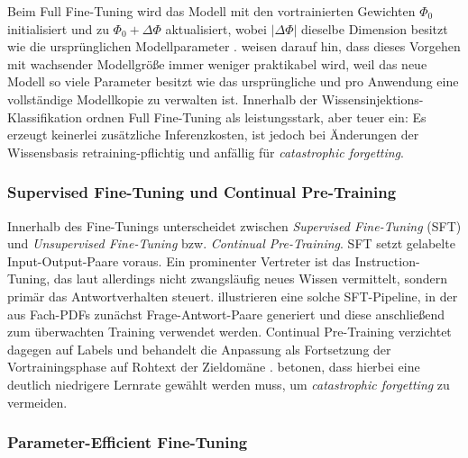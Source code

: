 Beim Full Fine-Tuning wird das Modell mit den vortrainierten Gewichten $\Phi_0$ initialisiert und zu $\Phi_0 + \Delta\Phi$ aktualisiert, wobei $|\Delta\Phi|$ dieselbe Dimension besitzt wie die ursprünglichen Modellparameter \autocite[3]{Hu.2022}. \textcite[1]{Hu.2022} weisen darauf hin, dass dieses Vorgehen mit wachsender Modellgröße immer weniger praktikabel wird, weil das neue Modell so viele Parameter besitzt wie das ursprüngliche und pro Anwendung eine vollständige Modellkopie zu verwalten ist. Innerhalb der Wissensinjektions-Klassifikation ordnen \textcite[5]{Song.2025} Full Fine-Tuning als leistungsstark, aber teuer ein: Es erzeugt keinerlei zusätzliche Inferenzkosten, ist jedoch bei Änderungen der Wissensbasis retraining-pflichtig und anfällig für \textit{catastrophic forgetting}.

\subsubsection{Supervised Fine-Tuning und Continual Pre-Training}
\label{sec:ft-sft-cpt}

Innerhalb des Fine-Tunings unterscheidet \textcite[4]{Ovadia.2024} zwischen \textit{Supervised Fine-Tuning} (SFT) und \textit{Unsupervised Fine-Tuning} bzw. \textit{Continual Pre-Training}. SFT setzt gelabelte Input-Output-Paare voraus. Ein prominenter Vertreter ist das Instruction-Tuning, das laut \textcite[4]{Ovadia.2024} allerdings nicht zwangsläufig neues Wissen vermittelt, sondern primär das Antwortverhalten steuert. \textcite[10]{Balaguer.2024} illustrieren eine solche SFT-Pipeline, in der aus Fach-PDFs zunächst Frage-Antwort-Paare generiert und diese anschließend zum überwachten Training verwendet werden. Continual Pre-Training verzichtet dagegen auf Labels und behandelt die Anpassung als Fortsetzung der Vortrainingsphase auf Rohtext der Zieldomäne \autocite[4]{Ovadia.2024}. \textcite[4]{Ovadia.2024} betonen, dass hierbei eine deutlich niedrigere Lernrate gewählt werden muss, um \textit{catastrophic forgetting} zu vermeiden.

\subsubsection{Parameter-Efficient Fine-Tuning}
\label{sec:ft-peft}

